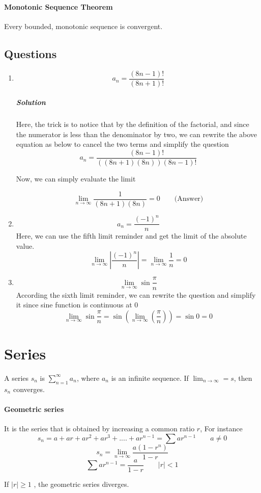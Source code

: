 \documentclass{article}
\begin{document}
\paragraph{Monotonic Sequence Theorem}
Every bounded, monotonic sequence is convergent.

\subsection{Questions}

\begin{enumerate}[1.]
\item
\[
	a_n = \frac{ (8n-1)! }{ (8n+1)! } 
\]

\subparagraph{Solution}
Here, the trick is to notice that by the definition of the factorial, and since the numerator is less than the denominator by two, we can rewrite the above equation as below to cancel the two terms and simplify the question
\[
	a_n= \frac{ (8n-1)! }{ ((8n+1)(8n))(8n-1)!  } 
\]

Now, we can simply evaluate the limit

\[
	\lim_{n \to \infty} \frac{1}{(8n+1)(8n)} = 0 \qquad \text{(Answer)}
\]
\item \[
		a_n= \frac{ (-1)^n }{ n } 
\]
Here, we can use the fifth limit reminder and get the limit of the absolute value. 
\[
	\lim_{n \to \infty} \left|  \frac{ (-1)^n }{ n }   \right| = 
		\lim_{n \to \infty} \frac{1}{n} = 0
\]

\item $$\lim_{n \to \infty} \sin{ \frac{\pi}{n} } $$
	According the sixth limit reminder, we can rewrite the question and simplify it since sine function is continuous at 0 
		\[\lim_{n \to \infty} \sin{ \frac{\pi}{n} } = 
			\sin{ \left( \lim_{n \to \infty} (\frac{\pi}{n}) \right) } = \sin{ 0 } = 0
		\]
		
\end{enumerate}

\newpage
\section{Series}
A series $ s_n $  is  $\sum^{\infty}_{n=1} a_n$, where $ a_n $ is an infinite sequence.
If $\lim_{n \to \infty} = s$, then $s_n$ converges. 

\paragraph{Geometric series}
It is the series that is obtained by increasing a common ratio $ r $, For instance
\[
	s_n = a + ar + ar^2 + ar^3 + .... + ar^{n-1} = \sum ar^{n-1} \qquad a \neq 0
\]
\[
	s_n = \lim_{n \to \infty} \frac{ a(1-r^n) }{ 1-r }
\]
$$ \sum ar^{n-1} = \frac{ a }{ 1-r }  \qquad |r|<1 $$
\begin{center}
If $ |r| \geq 1 $ , the geometric series diverges.
\end{center}
\end{document}
